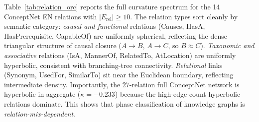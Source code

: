\documentclass[11pt,a4paper]{article}
\newcommand{\kbar}{\bar{\kappa}}
\begin{document}
Table~\ref{tab:relation_orc} reports the full curvature spectrum for the 14 ConceptNet EN relations with $|E_{\text{rel}}| \geq 10$. The relation types sort cleanly by semantic category: \emph{causal and functional} relations (Causes, HasA, HasPrerequisite, CapableOf) are uniformly spherical, reflecting the dense triangular structure of causal closure ($A \to B$, $A \to C$, so $B \approx C$). \emph{Taxonomic and associative} relations (IsA, MannerOf, RelatedTo, AtLocation) are uniformly hyperbolic, consistent with branching-tree connectivity. \emph{Relational} links (Synonym, UsedFor, SimilarTo) sit near the Euclidean boundary, reflecting intermediate density. Importantly, the 27-relation full ConceptNet network is hyperbolic in aggregate ($\kbar = -0.233$) because the high-edge-count hyperbolic relations dominate. This shows that phase classification of knowledge graphs is \emph{relation-mix-dependent}.
\end{document}
